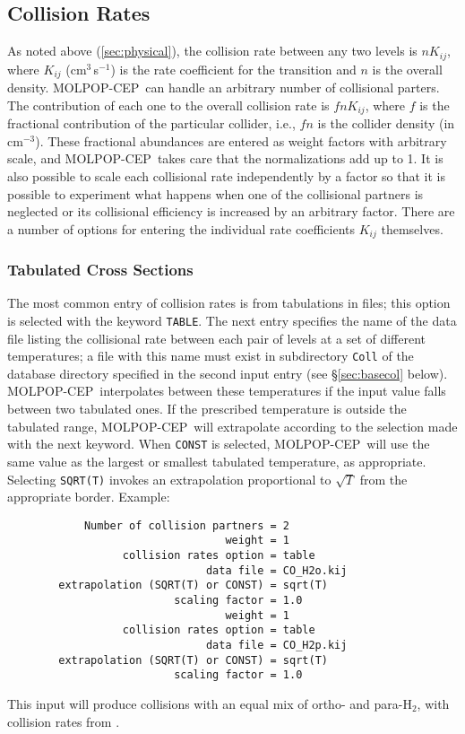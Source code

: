 \documentclass[12pt]{article}
\def\separation {0.5cm}
\def\M{MOLPOP-CEP}
\begin{document}
\subsection{Collision Rates}
\label{sec:collisions}

As noted above (\ref{sec:physical}), the collision rate between any two levels
is $nK_{ij}$, where $K_{ij}$ (cm$^3$\,s$^{-1}$) is the rate coefficient for the
transition and $n$ is the overall density. \M\ can handle an arbitrary number
of collisional parters. The contribution of each one to the overall collision
rate is $fnK_{ij}$, where $f$ is the fractional contribution of the particular
collider, i.e., $fn$ is the collider density (in cm$^{-3}$). These fractional
abundances are entered as weight factors with arbitrary scale, and \M\ takes
care that the normalizations add up to 1. It is also possible to scale each
collisional rate independently by a factor so that it is possible to experiment
what happens when one of the collisional partners is neglected or its
collisional efficiency is increased by an arbitrary factor. There are a number
of options for entering the individual rate coefficients $K_{ij}$ themselves.


\subsubsection{Tabulated Cross Sections}

The most common entry of collision rates is from tabulations in files; this
option is selected with the keyword \texttt{TABLE}. The next entry specifies
the name of the data file listing the collisional rate between each pair of
levels at a set of different temperatures; a file with this name must exist in
subdirectory {\tt Coll} of the database directory specified in the second input
entry (see \S\ref{sec:basecol} below). \M\ interpolates between these temperatures if the
input value falls between two tabulated ones. If the prescribed temperature is
outside the tabulated range, \M\ will extrapolate according to the selection
made with the next keyword. When \texttt{CONST} is selected, \M\ will use the
same value as the largest or smallest tabulated temperature, as appropriate.
Selecting \texttt{SQRT(T)} invokes an extrapolation proportional to $\sqrt{T}$
from the appropriate border. Example:

\vspace{\separation}
\begin{verbatim}
            Number of collision partners = 2
                                  weight = 1
                  collision rates option = table
                               data file = CO_H2o.kij
        extrapolation (SQRT(T) or CONST) = sqrt(T)
                          scaling factor = 1.0
                                  weight = 1
                  collision rates option = table
                               data file = CO_H2p.kij
        extrapolation (SQRT(T) or CONST) = sqrt(T)
                          scaling factor = 1.0
\end{verbatim}
This input will produce collisions with an equal mix of ortho- and para-H$_2$,
with collision rates from \cite{flower01}.
\end{document}
